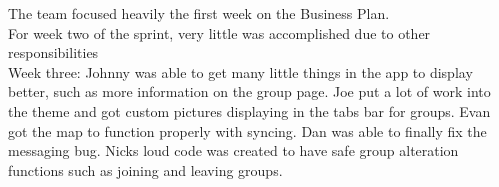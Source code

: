 \documentclass[11pt]{article}
\begin{document}
The team focused heavily the first week on the Business Plan.\\

For week two of the sprint, very little was accomplished due to other responsibilities\\

Week three: Johnny was able to get many little things in the app to display better, such as more information on the group page. Joe put a lot of work into the theme and got custom pictures displaying in the tabs bar for groups. Evan got the map to function properly with syncing. Dan was able to finally fix the messaging bug. Nicks loud code was created to have safe group alteration functions such as joining and leaving groups.\\
\end{document}
